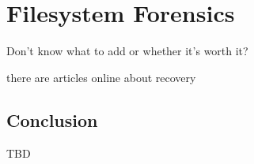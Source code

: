 \chapter{Filesystem Forensics}

Don't know what to add or whether it's worth it?

there are articles online about recovery

\section{Conclusion}

TBD
